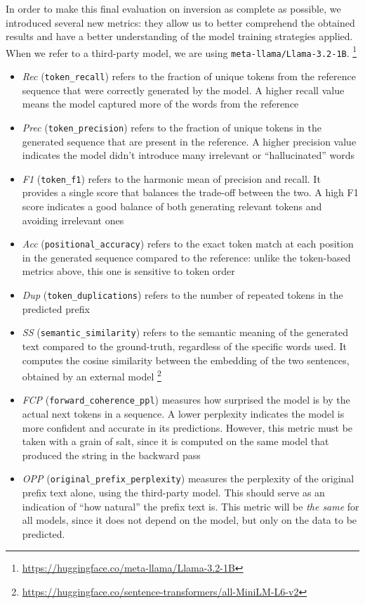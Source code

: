 \documentclass[../thesis.tex]{subfiles}
\begin{document}
In order to make this final evaluation on inversion as complete as possible, we introduced several new metrics: they allow us to better comprehend the obtained results and have a better understanding of the model training strategies applied. When we refer to a third-party model, we are using \texttt{meta-llama/Llama-3.2-1B}.
\footnote{\url{https://huggingface.co/meta-llama/Llama-3.2-1B}}
\begin{itemize}
    \item \emph{Rec} (\texttt{token\_recall}) refers to the fraction of unique tokens from the reference sequence that were correctly generated by the model. A higher recall value means the model captured more of the words from the reference
    \item \emph{Prec} (\texttt{token\_precision}) refers to the fraction of unique tokens in the generated sequence that are present in the reference. A higher precision value indicates the model didn't introduce many irrelevant or ``hallucinated'' words
    \item \emph{F1} (\texttt{token\_f1}) refers to the harmonic mean of precision and recall. It provides a single score that balances the trade-off between the two. A high F1 score indicates a good balance of both generating relevant tokens and avoiding irrelevant ones
    \item \emph{Acc} (\texttt{positional\_accuracy}) refers to the exact token match at each position in the generated sequence compared to the reference: unlike the token-based metrics above, this one is sensitive to token order
    \item \emph{Dup} (\texttt{token\_duplications}) refers to the number of repeated tokens in the predicted prefix
    \item \emph{SS} (\texttt{semantic\_similarity}) refers to the semantic meaning of the generated text compared to the ground-truth, regardless of the specific words used. It computes the cosine similarity between the embedding of the two sentences, obtained by an external model
    \footnote{\url{https://huggingface.co/sentence-transformers/all-MiniLM-L6-v2}}
    \item \emph{FCP} (\texttt{forward\_coherence\_ppl}) measures how surprised the model is by the actual next tokens in a sequence. A lower perplexity indicates the model is more confident and accurate in its predictions. However, this metric must be taken with a grain of salt, since it is computed on the same model that produced the string in the backward pass
    \item \emph{OPP} (\texttt{original\_prefix\_perplexity}) measures the perplexity of the original prefix text alone, using the third-party model. This should serve as an indication of ``how natural'' the prefix text is. This metric will be \emph{the same} for all models, since it does not depend on the model, but only on the data to be predicted.

\end{itemize}
\end{document}
